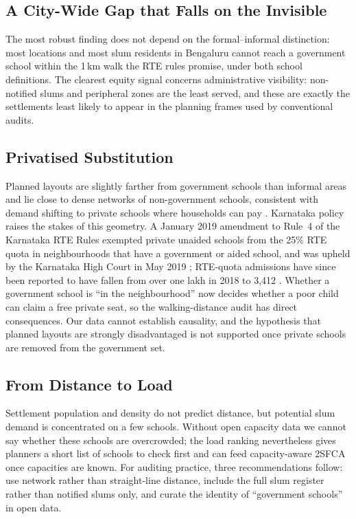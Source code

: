 \documentclass[conference]{IEEEtran}
\newcommand{\km}{\,km}
\begin{document}
\subsection{A City-Wide Gap that Falls on the Invisible}
The most robust finding does not depend on the formal--informal distinction: most locations and most slum residents in Bengaluru cannot reach a government school within the 1\km{} walk the RTE rules promise, under both school definitions. The clearest equity signal concerns administrative visibility: non-notified slums and peripheral zones are the least served, and these are exactly the settlements least likely to appear in the planning frames used by conventional audits.

\subsection{Privatised Substitution}
Planned layouts are slightly farther from government schools than informal areas and lie close to dense networks of non-government schools, consistent with demand shifting to private schools where households can pay \cite{kingdon2020}. Karnataka policy raises the stakes of this geometry. A January 2019 amendment to Rule~4 of the Karnataka RTE Rules exempted private unaided schools from the 25\% RTE quota in neighbourhoods that have a government or aided school, and was upheld by the Karnataka High Court in May 2019 \cite{hc2019}; RTE-quota admissions have since been reported to have fallen from over one lakh in 2018 to 3,412 \cite{tnie2026}. Whether a government school is ``in the neighbourhood'' now decides whether a poor child can claim a free private seat, so the walking-distance audit has direct consequences. Our data cannot establish causality, and the hypothesis that planned layouts are strongly disadvantaged is not supported once private schools are removed from the government set.

\subsection{From Distance to Load}
Settlement population and density do not predict distance, but potential slum demand is concentrated on a few schools. Without open capacity data we cannot say whether these schools are overcrowded; the load ranking nevertheless gives planners a short list of schools to check first and can feed capacity-aware 2SFCA \cite{luo2003} once capacities are known. For auditing practice, three recommendations follow: use network rather than straight-line distance, include the full slum register rather than notified slums only, and curate the identity of ``government schools'' in open data.
\end{document}
